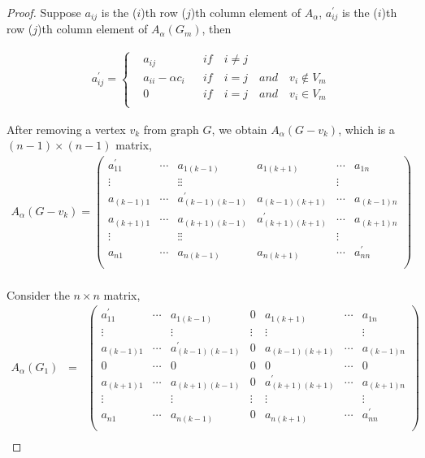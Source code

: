 \documentclass[amsthm]{elsart}
\begin{document}
\begin{proof}
Suppose $a_{ij}$ is the ($i$)th row ($j$)th column element of $A_\alpha$,  $a_{ij}^{\prime}$ is the ($i$)th row ($j$)th column element of $A_\alpha(G_m)$, then

\begin{eqnarray*}
 a_{ij}^{\prime} =
\left\{
\begin{aligned}
&a_{ij}    && if \quad i \neq j \\
&a_{ii} - \alpha c_i    && if \quad i = j \quad and \quad v_i \notin V_m   \\
&0    && if \quad i = j \quad and \quad v_i \in V_m \\
\end{aligned}
\right.
\end{eqnarray*}

After removing a vertex $v_k$ from graph $G$, we obtain $A_\alpha(G - v_k)$,
 which is a $(n - 1) \times (n - 1)$ matrix, \\

\begin{eqnarray*}
A_\alpha(G - v_k) =
\begin{pmatrix}
a_{11}^{\prime} & \cdots & a_{1(k-1)} & a_{1(k+1)} & \cdots & a_{1n}\\
\vdots & {} & \vdots \vdots & {} & \vdots \\
a_{(k-1)1} & \cdots & a_{(k-1)(k-1)}^{\prime} & a_{(k-1)(k+1)} & \cdots & a_{(k-1)n}\\
a_{(k+1)1} & \cdots & a_{(k+1)(k-1)} & a_{(k+1)(k+1)}^{\prime} & \cdots & a_{(k+1)n}\\
\vdots & {} & \vdots \vdots & {} & \vdots \\
a_{n1} & \cdots & a_{n(k-1)} & a_{n(k+1)} & \cdots & a_{nn}^{\prime}\\
\end{pmatrix} \\
\end{eqnarray*}

Consider the $n \times n$ matrix, \\
\begin{eqnarray*}
A_\alpha(G_1) \;\;=\;\;
\begin{pmatrix}
a_{11}^{\prime} & \cdots & a_{1(k-1)} & 0 & a_{1(k+1)} & \cdots & a_{1n} \\
\vdots & {} & \vdots & \vdots & \vdots & {} & \vdots \\
a_{(k-1)1} & \cdots & a_{(k-1)(k-1)}^{\prime} & 0 & a_{(k-1)(k+1)} & \cdots & a_{(k-1)n} \\
0 & \cdots & 0 & 0 & 0 & \cdots & 0 \\
a_{(k+1)1} & \cdots & a_{(k+1)(k-1)} & 0 & a_{(k+1)(k+1)}^{\prime} & \cdots & a_{(k+1)n} \\
\vdots & {} & \vdots & \vdots & \vdots & {} & \vdots \\
a_{n1} & \cdots & a_{n(k-1)} & 0 & a_{n(k+1)} & \cdots & a_{nn}^{\prime} \\
\end{pmatrix} \\
\end{eqnarray*}


\end{proof}
\end{document}
